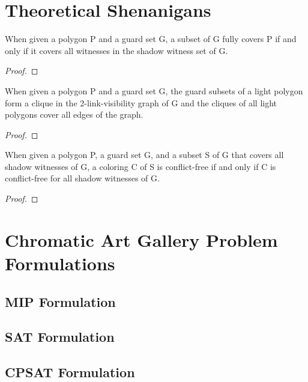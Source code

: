 \chapter{Theoretical Shenanigans}

\begin{theorem}
When given a polygon P and a guard set G, a subset of G fully covers P if and only if it covers all witnesses in the shadow witness set of G.
\end{theorem}
\begin{proof}
    
\end{proof}

\begin{theorem}
When given a polygon P and a guard set G, the guard subsets of a light polygon form a clique in the 2-link-visibility graph of G and the cliques of all light polygons cover all edges of the graph.
\end{theorem}
\begin{proof}
    
\end{proof}

\begin{theorem}
When given a polygon P, a guard set G, and a subset S of G that covers all shadow witnesses of G, a coloring C of S is conflict-free if and only if C is conflict-free for all shadow witnesses of G.
\end{theorem}
\begin{proof}
    
\end{proof}

\chapter{Chromatic Art Gallery Problem Formulations}

\section{MIP Formulation}

\section{SAT Formulation}

\section{CPSAT Formulation}

